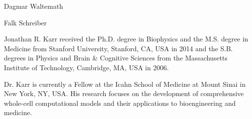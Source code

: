 \documentclass[journal,transmag]{IEEEtran}
\begin{document}
\ifCLASSOPTIONcaptionsoff
  \newpage
\fi





% 

\begin{IEEEbiography}{Dagmar Waltemath}
\end{IEEEbiography}

\begin{IEEEbiography}{Falk Schreiber}
\end{IEEEbiography}

\begin{IEEEbiography}{Jonathan R. Karr}
received the Ph.D. degree in Biophysics and the M.S. degree in Medicine from Stanford University, Stanford, CA, USA in 2014 and the S.B. degrees in Physics and Brain \& Cognitive Sciences from the Massachusetts Institute of Technology, Cambridge, MA, USA in 2006.

Dr. Karr is currently a Fellow at the Icahn School of Medicine at Mount Sinai in New York, NY, USA. His research focuses on the development of comprehensive whole-cell computational models and their applications to bioengineering and medicine.
\end{IEEEbiography}
\end{document}

